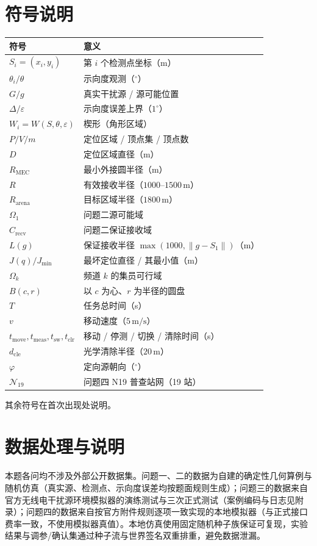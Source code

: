 \documentclass[12pt,a4paper]{article}
\newcommand{\Rmec}{R_{\mathrm{MEC}}}
\newcommand{\Crecv}{C_{\mathrm{recv}}}
\begin{document}
\section{符号说明}
\begin{table}[H]
\centering
\begin{tabularx}{\textwidth}{@{}L{4.4cm}Y@{}}
\toprule
\textbf{符号} & \textbf{意义} \\
\midrule
$S_i=(x_i,y_i)$ & 第 $i$ 个检测点坐标（m） \\
$\theta_i/\theta$ & 示向度观测（$^{\circ}$） \\
$G/g$ & 真实干扰源 / 源可能位置 \\
$\Delta/\varepsilon$ & 示向度误差上界（$1^{\circ}$） \\
$W_i=W(S,\theta,\varepsilon)$ & 楔形（角形区域） \\
$P/V/m$ & 定位区域 / 顶点集 / 顶点数 \\
$D$ & 定位区域直径（m） \\
$\Rmec$ & 最小外接圆半径（m） \\
$R$ & 有效接收半径（$1000$--$1500\,\mathrm{m}$） \\
$R_{\mathrm{arena}}$ & 目标区域半径（$1800\,\mathrm{m}$） \\
$\Omega_1$ & 问题二源可能域 \\
$\Crecv$ & 问题二保证接收域 \\
$L(g)$ & 保证接收半径 $\max(1000,\lVert g-S_1\rVert)$（m） \\
$J(q)/J_{\min}$ & 最坏定位直径 / 其最小值（m） \\
$\Omega_k$ & 频道 $k$ 的集员可行域 \\
$B(c,r)$ & 以 $c$ 为心、$r$ 为半径的圆盘 \\
$T$ & 任务总时间（s） \\
$v$ & 移动速度（$5\,\mathrm{m/s}$） \\
$t_{\mathrm{move}},t_{\mathrm{meas}},t_{\mathrm{sw}},t_{\mathrm{clr}}$ & 移动 / 停测 / 切换 / 清除时间（s） \\
$d_{\mathrm{cle}}$ & 光学清除半径（$20\,\mathrm{m}$） \\
$\varphi$ & 定向源朝向（$^{\circ}$） \\
$\mathcal{N}_{19}$ & 问题四 N19 普查站网（19 站） \\
\bottomrule
\end{tabularx}
\end{table}

\noindent 其余符号在首次出现处说明。

\section{数据处理与说明}
本题各问均不涉及外部公开数据集。问题一、二的数据为自建的确定性几何算例与随机仿真（真实源、检测点、示向度误差均按题面规则生成）；问题三的数据来自官方无线电干扰源环境模拟器的演练测试与三次正式测试（案例编码与日志见附录）；问题四的数据来自按官方附件规则逐项一致实现的本地模拟器（与正式接口费率一致，不使用模拟器真值）。本地仿真使用固定随机种子族保证可复现，实验结果与调参/确认集通过种子流与世界签名双重排重，避免数据泄漏。
\end{document}
